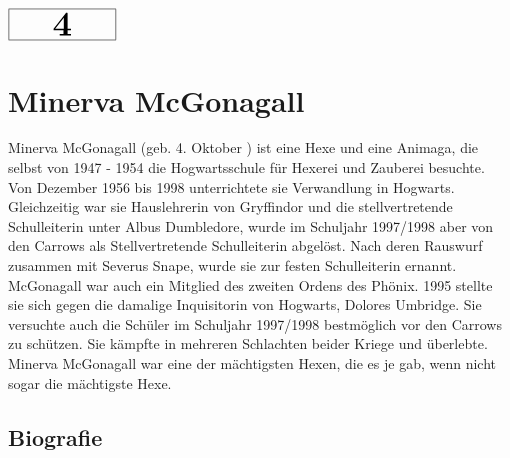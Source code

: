 \documentclass[a4paper, 10pt]{article}
\begin{document}
\begin{minipage}[t]{\textwidth}
    \vspace*{-1.5cm} %
    \begin{flushright}
        \hspace*{\fill} %
        $\boxed{\textbf{\Huge\phantom{00}4\phantom{00}}}$ %
    \end{flushright}
\end{minipage}

\section*{\huge Minerva McGonagall}
Minerva McGonagall (geb. 4. Oktober ) ist eine Hexe und eine Animaga, die selbst von 1947 - 1954 die Hogwartsschule für Hexerei und Zauberei besuchte. Von Dezember 1956 bis 1998 unterrichtete sie Verwandlung in Hogwarts. Gleichzeitig war sie Hauslehrerin von Gryffindor und die stellvertretende Schulleiterin unter Albus Dumbledore, wurde im Schuljahr 1997/1998 aber von den Carrows als Stellvertretende Schulleiterin abgelöst. Nach deren Rauswurf zusammen mit Severus Snape, wurde sie zur festen Schulleiterin ernannt. McGonagall war auch ein Mitglied des zweiten Ordens des Phönix. 1995 stellte sie sich gegen die damalige Inquisitorin von Hogwarts, Dolores Umbridge. Sie versuchte auch die Schüler im Schuljahr 1997/1998 bestmöglich vor den Carrows zu schützen. Sie kämpfte in mehreren Schlachten beider Kriege und überlebte.
\vspace{10pt}
\newline
{}  
Minerva McGonagall war eine der mächtigsten Hexen, die es je gab, wenn nicht sogar die mächtigste Hexe.
\subsection*{\Large Biografie}
\end{document}
